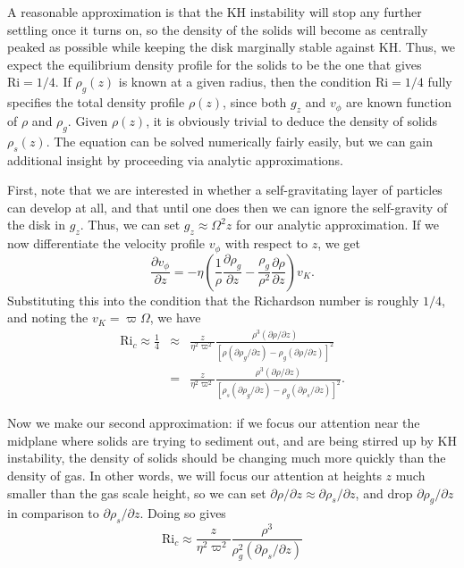 A reasonable approximation is that the KH instability will stop any further settling once it turns on, so the density of the solids will become as centrally peaked as possible while keeping the disk marginally stable against KH. Thus, we expect the equilibrium density profile for the solids to be the one that gives $\mbox{Ri}=1/4$. If $\rho_g(z)$ is known at a given radius, then the condition $\mbox{Ri} =1/4$ fully specifies the total density profile $\rho(z)$, since both $g_z$ and $v_\phi$ are known function of $\rho$ and $\rho_g$. Given $\rho(z)$, it is obviously trivial to deduce the density of solids $\rho_s(z)$. The equation can be solved numerically fairly easily, but we can gain additional insight by proceeding via analytic approximations.

First, note that we are interested in whether a self-gravitating layer of particles can develop at all, and that until one does then we can ignore the self-gravity of the disk in $g_z$. Thus, we can set $g_z\approx \Omega^2 z$ for our analytic approximation. If we now differentiate the velocity profile $v_{\phi}$ with respect to $z$, we get
\begin{equation}
\frac{\partial v_\phi}{\partial z} = -\eta \left(\frac{1}{\rho} \frac{\partial \rho_g}{\partial z} - \frac{\rho_g}{\rho^2}\frac{\partial \rho}{\partial z}\right) v_K.
\end{equation}
Substituting this into the condition that the Richardson number is roughly $1/4$, and noting the $v_K = \varpi\Omega$, we have
\begin{eqnarray}
\mbox{Ri}_c \approx \frac{1}{4} 
& \approx &
\frac{z}{\eta^2 \varpi^2} \frac{\rho^3 (\partial \rho/\partial z)}{\left[\rho (\partial \rho_g/\partial z) - \rho_g (\partial \rho/\partial z)\right]^2} \\
& = &
\frac{z}{\eta^2 \varpi^2} \frac{\rho^3 (\partial \rho/\partial z)}{\left[\rho_s (\partial \rho_g/ \partial z) - \rho_g (\partial \rho_s/\partial z)\right]^2}.
\end{eqnarray}

Now we make our second approximation: if we focus our attention near the midplane where solids are trying to sediment out, and are being stirred up by KH instability, the density of solids should be changing much more quickly than the density of gas. In other words, we will focus our attention at heights $z$ much smaller than the gas scale height, so we can set $\partial \rho/\partial z \approx \partial \rho_s/\partial z$, and drop $\partial \rho_g/\partial z$ in comparison to $\partial \rho_s/\partial z$. Doing so gives
\begin{equation}
\mbox{Ri}_c \approx \frac{z}{\eta^2 \varpi^2} \frac{\rho^3}{\rho_g^2 (\partial\rho_s/\partial z)}
\end{equation}

